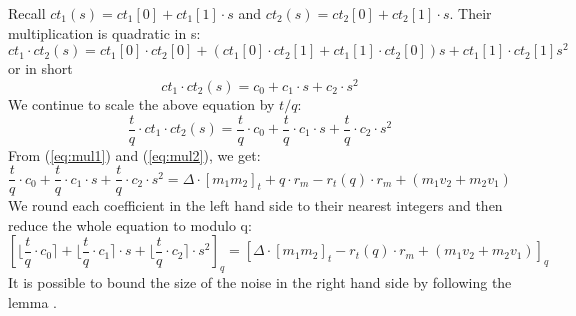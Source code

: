\documentclass[A4paper,12pt]{article}
\begin{document}
Recall $ct_1(s) = ct_1[0] + ct_1[1] \cdot s$ and $ct_2(s) = ct_2[0] + ct_2[1] \cdot s$. Their multiplication is quadratic in s:
\begin{equation*}
	ct_1 \cdot ct_2(s) = ct_1[0] \cdot ct_2[0] + (ct_1[0] \cdot ct_2[1] + ct_1[1] \cdot ct_2[0])s + ct_1[1] \cdot ct_2[1]s^2
\end{equation*}
or in short
\begin{equation*}
ct_1 \cdot ct_2(s) = c_0 + c_1 \cdot s + c_2 \cdot s^2
\end{equation*}
We continue to scale the above equation by $t/q$:
\begin{equation}\label{eq:mul2}
\frac{t}{q} \cdot ct_1 \cdot ct_2(s) = \frac{t}{q} \cdot c_0 + \frac{t}{q} \cdot c_1 \cdot s + \frac{t}{q} \cdot c_2 \cdot s^2
\end{equation}
From (\ref{eq:mul1}) and (\ref{eq:mul2}), we get:
\begin{equation*}
	\frac{t}{q} \cdot c_0 + \frac{t}{q} \cdot c_1 \cdot s + \frac{t}{q} \cdot c_2 \cdot s^2 = 
	\Delta \cdot [m_1m_2]_t + q \cdot r_m - r_t(q) \cdot r_m + (m_1v_2 + m_2v_1)
\end{equation*}
We round each coefficient in the left hand side to their nearest integers and then reduce the whole equation to modulo q:
\begin{equation}\label{eq:mul3}
	[\lfloor \frac{t}{q} \cdot c_0 \rceil  +  \lfloor \frac{t}{q} \cdot c_1 \rceil  \cdot s + 	\lfloor \frac{t}{q} \cdot c_2 \rceil   \cdot s^2]_q = 
	[\Delta \cdot [m_1m_2]_t - r_t(q) \cdot r_m + (m_1v_2 + m_2v_1)]_q
\end{equation}
It is possible to bound the size of the noise in the right hand side by following the lemma \cite{SHE}.
\end{document}
